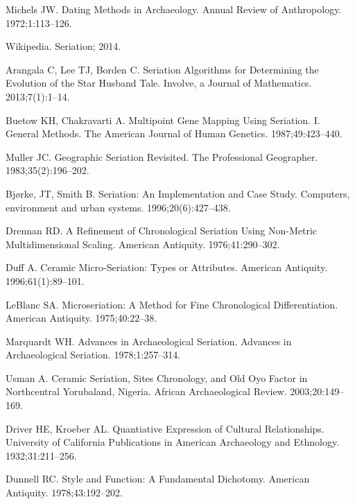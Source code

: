 \documentclass[10pt,letterpaper]{article}
\begin{document}
\begin{thebibliography}{10}
Michels JW.
\newblock Dating Methods in Archaeology.
\newblock Annual Review of Anthropology. 1972;1:113--126.

Wikipedia.
\newblock Seriation; 2014.

Arangala C, Lee TJ, Borden C.
\newblock Seriation Algorithms for Determining the Evolution of the Star
  Husband Tale.
\newblock Involve, a Journal of Mathematics. 2013;7(1):1--14.

Buetow KH, Chakravarti A.
\newblock Multipoint Gene Mapping Using Seriation. I. General Methods.
\newblock The American Journal of Human Genetics. 1987;49:423--440.

Muller JC.
\newblock Geographic Seriation Revisited.
\newblock The Professional Geographer. 1983;35(2):196--202.

Bj{\o}rke, JT, Smith B.
\newblock Seriation: An Implementation and Case Study.
\newblock Computers, environment and urban systems. 1996;20(6):427--438.

Drennan RD.
\newblock A Refinement of Chronological Seriation Using Non-Metric
  Multidimensional Scaling.
\newblock American Antiquity. 1976;41:290--302.

Duff A.
\newblock Ceramic Micro-Seriation: Types or Attributes.
\newblock American Antiquity. 1996;61(1):89--101.

LeBlanc SA.
\newblock Microseriation: A Method for Fine Chronological Differentiation.
\newblock American Antiquity. 1975;40:22--38.

Marquardt WH.
\newblock Advances in Archaeological Seriation.
\newblock Advances in Archaeological Seriation. 1978;1:257--314.

Usman A.
\newblock Ceramic Seriation, Sites Chronology, and Old Oyo Factor in
  Northcentral Yorubaland, Nigeria.
\newblock African Archaeological Review. 2003;20:149--169.

Driver HE, Kroeber AL.
\newblock Quantiative Expression of Cultural Relationships.
\newblock University of California Publications in American Archaeology and
  Ethnology. 1932;31:211--256.

Dunnell RC.
\newblock Style and Function: A Fundamental Dichotomy.
\newblock American Antiquity. 1978;43:192--202.


\end{thebibliography}
\end{document}

